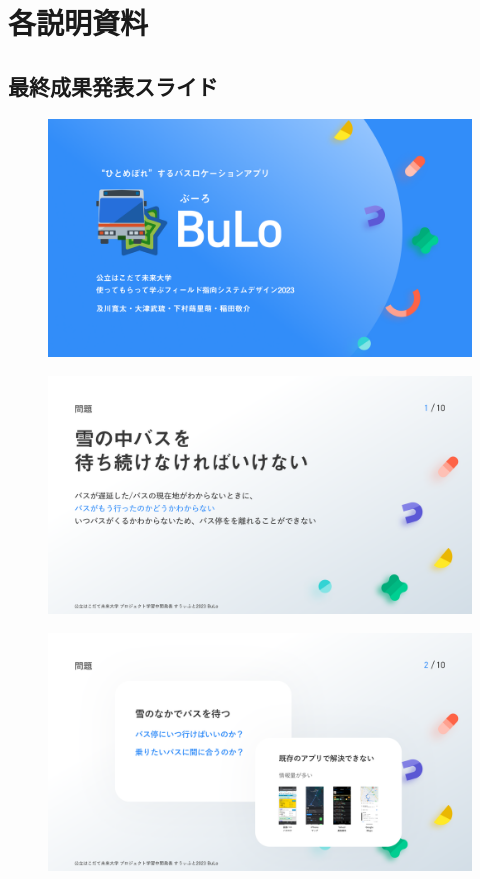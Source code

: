 \chapter{各説明資料}
\section{最終成果発表スライド}
\begin{figure}[htbp]
    \centering
    \includegraphics[width=14cm]{images/slide0.png}
    \label{fig:slide0}
\end{figure}
\begin{figure}[htbp]
    \includegraphics[width=14cm]{images/slide1.png}
    \label{fig:slide1}
\end{figure}
\begin{figure}[htbp]
    \includegraphics[width=14cm]{images/slide2.png}
    \label{fig:slide2}
\end{figure}
